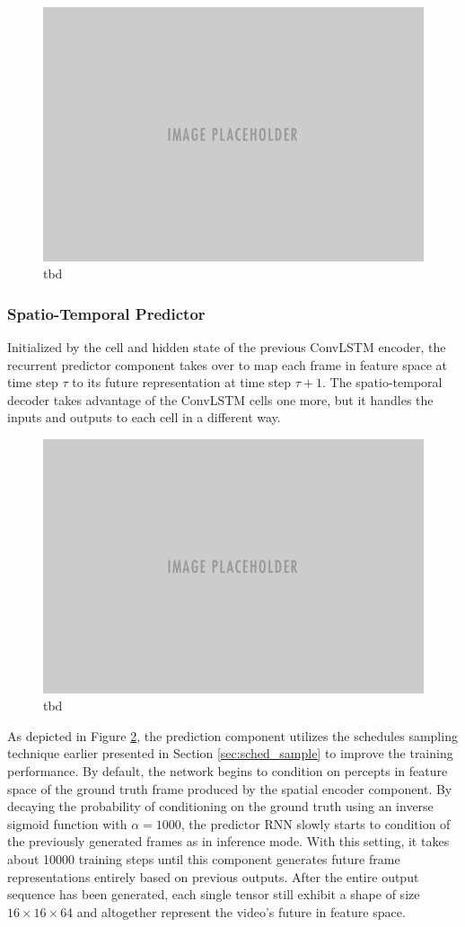 \begin{figure}[htb]
	\centering
	\includegraphics[width=0.6\linewidth]{figures/placeholder.png} 
	\caption[Spatio-Temporal Encoding Component]{tbd} \label{fig:comp-spatiotemp_encoder}
\end{figure}

\subsubsection{Spatio-Temporal Predictor}

Initialized by the cell and hidden state of the previous ConvLSTM encoder, the recurrent predictor component takes over to map each frame in feature space at time step $\tau$ to its future representation at time step $\tau + 1$. The spatio-temporal decoder takes advantage of the ConvLSTM cells one more, but it handles the inputs and outputs to each cell in a different way.

\begin{figure}[htb]
	\centering
	\includegraphics[width=0.6\linewidth]{figures/placeholder.png} 
	\caption[Spatio-Temporal Predictor Component]{tbd} \label{fig:comp-spatiotemp_predictor}
\end{figure}

As depicted in Figure \ref{fig:comp-spatiotemp_predictor}, the prediction component utilizes the schedules sampling technique earlier presented in Section \ref{sec:sched_sample} to improve the training performance. By default, the network begins to condition on percepts in feature space of the ground truth frame produced by the spatial encoder component. By decaying the probability of conditioning on the ground truth using an inverse sigmoid function with $\alpha = 1000$, the predictor RNN slowly starts to condition of the previously generated frames as in inference mode. With this setting, it takes about \num{10000} training steps until this component generates future frame representations entirely based on previous outputs. After the entire output sequence has been generated, each single tensor still exhibit a shape of size $16\times16\times64$ and altogether represent the video's future in feature space.

